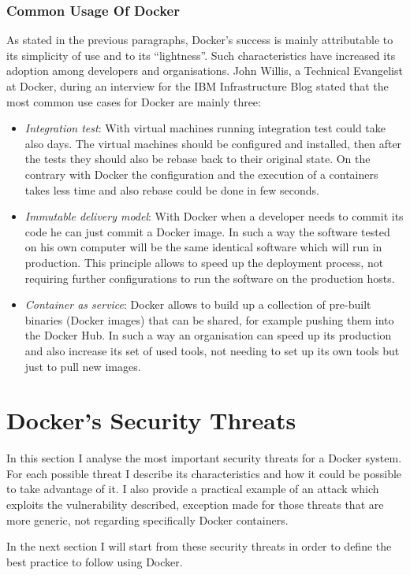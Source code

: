 \documentclass[a4paper,12pt]{article}
\begin{document}
\subsubsection{Common Usage Of Docker}

As stated in the previous paragraphs, Docker's success is mainly attributable to
its simplicity of use and to its ``lightness''. Such characteristics have
increased its adoption among developers and organisations. John Willis, a
Technical Evangelist at Docker, during an interview
\cite{ibm_interview_john_willis} for the IBM Infrastructure Blog stated that the
most common use cases for Docker are mainly three:
\begin{itemize}
  \item \textit{Integration test}: With virtual machines running integration
  test could take also days. The virtual machines should be configured and
  installed, then after the tests they should also be rebase back to their
  original state. On the contrary with Docker the configuration and the
  execution of a containers takes less time and also rebase could be done in few
  seconds.
  \item \textit{Immutable delivery model}: With Docker when a developer needs to
  commit its code he can just commit a Docker image. In such a way the software
  tested on his own computer will be the same identical software which will run
  in production. This principle allows to speed up the deployment process, not
  requiring further configurations to run the software on the production hosts.
  \item \textit{Container as service}: Docker allows to build up a collection of
  pre-built binaries (Docker images) that can be shared, for example pushing
  them into the Docker Hub. In such a way an organisation can speed up its
  production and also increase its set of used tools, not needing to set up its
  own tools but just to pull new images.
  
\end{itemize}

\newpage

\section{Docker's Security Threats}
\label{sec:docker_security_threats}
 
In this section I analyse the most important security threats for a Docker
system. For each possible threat I describe its characteristics and how it could
be possible to take advantage of it. I also provide a practical example of an
attack which exploits the vulnerability described, exception made for those
threats that are more generic, not regarding specifically Docker containers.
\par In the next section I will start from these security threats in order to
define the best practice to follow using Docker.
\end{document}
